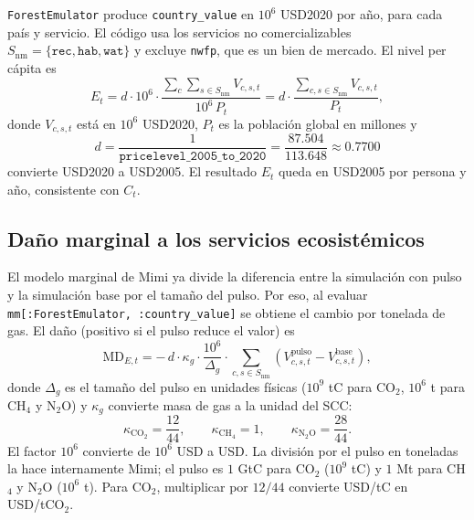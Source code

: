 \documentclass[11pt,a4paper]{article}
\begin{document}
\texttt{ForestEmulator} produce \texttt{country\_value} en
\(10^6\) USD2020 por año, para cada país y servicio. El código usa los
servicios no comercializables \(S_{\mathrm{nm}}=\{\texttt{rec},\texttt{hab},
\texttt{wat}\}\) y excluye \texttt{nwfp}, que es un bien de mercado. El nivel
per cápita es
\begin{equation}
  E_t =
  d \cdot 10^6 \cdot
  \frac{\sum_{c}\sum_{s\in S_{\mathrm{nm}}} V_{c,s,t}}{10^6\,P_t}
  =
  d \cdot \frac{\sum_{c,s\in S_{\mathrm{nm}}} V_{c,s,t}}{P_t},
  \label{eq:E}
\end{equation}
donde \(V_{c,s,t}\) está en \(10^6\) USD2020, \(P_t\) es la población global
en millones y
\begin{equation}
  d = \frac{1}{\texttt{pricelevel\_2005\_to\_2020}}
    = \frac{87.504}{113.648}
    \approx 0.7700
\end{equation}
convierte USD2020 a USD2005. El resultado \(E_t\) queda en USD2005 por persona
y año, consistente con \(C_t\).

\subsection{Daño marginal a los servicios ecosistémicos}

El modelo marginal de Mimi ya divide la diferencia entre la simulación con
pulso y la simulación base por el tamaño del pulso. Por eso, al evaluar
\texttt{mm[:ForestEmulator, :country\_value]} se obtiene el cambio por tonelada
de gas. El daño (positivo si el pulso reduce el valor) es
\begin{equation}
  \mathrm{MD}_{E,t} =
  -\, d \cdot \kappa_g \cdot \frac{10^6}{\Delta_g} \cdot
  \sum_{c,s\in S_{\mathrm{nm}}}
  \left(V^{\mathrm{pulso}}_{c,s,t} - V^{\mathrm{base}}_{c,s,t}\right),
  \label{eq:MDE}
\end{equation}
donde \(\Delta_g\) es el tamaño del pulso en unidades físicas
(\(10^9\) tC para CO\(_2\), \(10^6\) t para CH\(_4\) y N\(_2\)O) y
\(\kappa_g\) convierte masa de gas a la unidad del SCC:
\begin{equation}
  \kappa_{\mathrm{CO_2}} = \frac{12}{44}, \qquad
  \kappa_{\mathrm{CH_4}} = 1, \qquad
  \kappa_{\mathrm{N_2O}} = \frac{28}{44}.
\end{equation}
El factor \(10^6\) convierte de \(10^6\) USD a USD. La división por el pulso
en toneladas la hace internamente Mimi; el pulso es \(1\) GtC para CO\(_2\)
(\(10^9\) tC) y \(1\) Mt para CH\(_4\) y N\(_2\)O (\(10^6\) t).
Para CO\(_2\), multiplicar por \(12/44\) convierte USD/tC en USD/tCO\(_2\).
\end{document}
